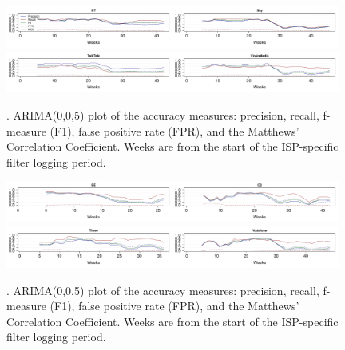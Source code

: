 \documentclass{bmcart}
\begin{document}
\begin{figure}[h!]
\caption{. ARIMA(0,0,5) plot of the accuracy measures: precision, recall, f-measure (F1), false positive rate (FPR), and the Matthews' Correlation Coefficient. Weeks are from the start of the ISP-specific filter logging period.}
\includegraphics[width=0.49\textwidth]{imgs/BT-ts-accuracy}\includegraphics[width=0.49\textwidth]{imgs/Sky-ts-accuracy}
\includegraphics[width=0.49\textwidth]{imgs/TalkTalk-ts-accuracy}\includegraphics[width=0.49\textwidth]{imgs/VirginMedia-ts-accuracy}
\label{fig:broadband-accuracy-ts}
\end{figure}

\begin{figure}[h!]
\caption{. ARIMA(0,0,5) plot of the accuracy measures: precision, recall, f-measure (F1), false positive rate (FPR), and the Matthews' Correlation Coefficient. Weeks are from the start of the ISP-specific filter logging period.}
\includegraphics[width=0.49\textwidth]{imgs/EE-ts-accuracy}\includegraphics[width=0.49\textwidth]{imgs/O2-ts-accuracy}
\includegraphics[width=0.49\textwidth]{imgs/Three-ts-accuracy}\includegraphics[width=0.49\textwidth]{imgs/Vodafone-ts-accuracy}
\label{fig:mobile-accuracy-ts}
\end{figure}
\clearpage
\end{document}

